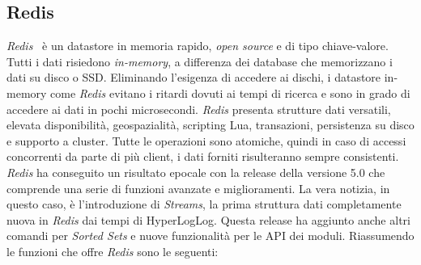 \documentclass[12pt,a4paper,openright,oneside]{book}
\begin{document}
\subsection{Redis}
\textit{Redis}~\cite{redis} è un datastore in memoria rapido, \textit{open source} e di tipo chiave-valore.
Tutti i dati risiedono \textit{in-memory}, a differenza dei database che memorizzano i dati su disco o SSD. Eliminando l'esigenza di accedere ai dischi, i datastore in-memory come \textit{Redis} evitano i ritardi dovuti ai tempi di ricerca e sono in grado di accedere ai dati in pochi microsecondi.
\textit{Redis} presenta strutture dati versatili, elevata disponibilità, geospazialità, scripting Lua, transazioni, persistenza su disco e supporto  a cluster. Tutte le operazioni sono atomiche, quindi in caso di accessi concorrenti da parte di più client, i dati forniti risulteranno sempre consistenti.
\textit{Redis} ha conseguito un risultato epocale con la release della versione 5.0 che comprende una serie di funzioni avanzate e miglioramenti. La vera notizia, in questo caso, è l’introduzione di \textit{Streams}, la prima struttura dati completamente nuova in \textit{Redis} dai tempi di HyperLogLog. Questa release ha aggiunto anche altri comandi per \textit{Sorted Sets} e nuove funzionalità per le API dei moduli.
Riassumendo le funzioni che offre \textit{Redis} sono le seguenti:
\end{document}
